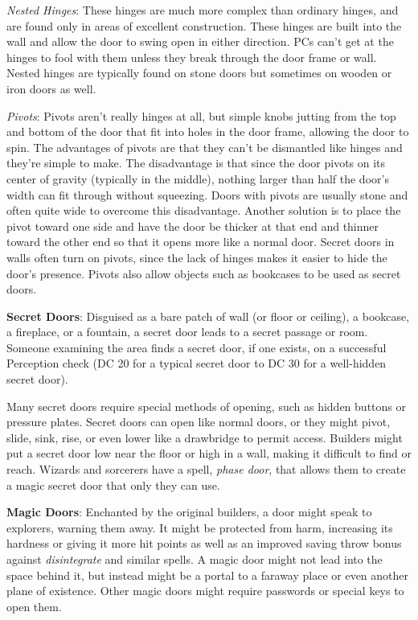 \textit{Nested Hinges}: These hinges are much more complex than ordinary hinges, and are found only in areas of excellent construction. These hinges are built into the wall and allow the door to swing open in either direction. PCs can't get at the hinges to fool with them unless they break through the door frame or wall. Nested hinges are typically found on stone doors but sometimes on wooden or iron doors as well. 
				
\textit{Pivots}: Pivots aren't really hinges at all, but simple knobs jutting from the top and bottom of the door that fit into holes in the door frame, allowing the door to spin. The advantages of pivots are that they can't be dismantled like hinges and they're simple to make. The disadvantage is that since the door pivots on its center of gravity (typically in the middle), nothing larger than half the door's width can fit through without squeezing. Doors with pivots are usually stone and often quite wide to overcome this disadvantage. Another solution is to place the pivot toward one side and have the door be thicker at that end and thinner toward the other end so that it opens more like a normal door. Secret doors in walls often turn on pivots, since the lack of hinges makes it easier to hide the door's presence. Pivots also allow objects such as bookcases to be used as secret doors.
				
\textbf{Secret Doors}: Disguised as a bare patch of wall (or floor or ceiling), a bookcase, a fireplace, or a fountain, a secret door leads to a secret passage or room. Someone examining the area finds a secret door, if one exists, on a successful Perception check (DC 20 for a typical secret door to DC 30 for a well-hidden secret door).
				
Many secret doors require special methods of opening, such as hidden buttons or pressure plates. Secret doors can open like normal doors, or they might pivot, slide, sink, rise, or even lower like a drawbridge to permit access. Builders might put a secret door low near the floor or high in a wall, making it difficult to find or reach. Wizards and sorcerers have a spell, \textit{phase door}, that allows them to create a magic secret door that only they can use.
				
\textbf{Magic Doors}: Enchanted by the original builders, a door might speak to explorers, warning them away. It might be protected from harm, increasing its hardness or giving it more hit points as well as an improved saving throw bonus against \textit{disintegrate }and similar spells. A magic door might not lead into the space behind it, but instead might be a portal to a faraway place or even another plane of existence. Other magic doors might require passwords or special keys to open them. 
				
